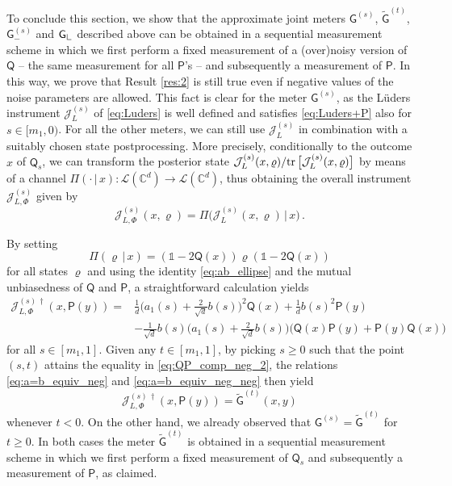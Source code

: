 \documentclass[12pt,reqno]{amsart}
\theoremstyle{definition}
\newcommand{\tr}[1]{{\rm tr}\left[#1\right]} %
\newcommand{\id}{\mathds{1}} %
\newcommand{\Qo}{\mathsf{Q}}%
\newcommand{\Po}{\mathsf{P}}%
\newcommand{\Go}{\mathsf{G}}%
\newcommand{\Lcorner}{{\mathchoice{\mathrel{\makebox[7pt][c]{\rule{.4pt}{7.5pt}\rule{5pt}{.4pt}}}}{\mathrel{\makebox[7pt][c]{\rule{.4pt}{7.5pt}\rule{5pt}{.4pt}}}}{\mathrel{\makebox[5.5pt][c]{\rule{.4pt}{5.25pt}\rule{3.5pt}{.4pt}}}}{\mathrel{\makebox[4pt][c]{\rule{.4pt}{3.75pt}\rule{2.5pt}{.4pt}}}}}}
\newcommand{\rhoo}{\varrho} %
\newcommand{\Cb}{\mathbb{C}} %
\newcommand{\lc}[1]{\mathcal{L}(\Cb^{#1})} %
\newcommand{\ii}{\mathcal{J}}
\begin{document}
To conclude this section, we show that the approximate joint meters $\Go^{(s)}$, $\tilde{\Go}^{(t)}$, $\Go^{(s)}_-$ and $\Go_\Lcorner$ described above can be obtained in a sequential measurement scheme in which we first perform a fixed measurement of a (over)noisy version of $\Qo$ -- the same measurement for all $\Po$'s --  and subsequently a measurement of $\Po$. In this way, we prove that Result \ref{res:2} is still true even if negative values of the noise parameters are allowed. This fact is clear for the meter $\Go^{(s)}$, as the L\"uders instrument $\ii_L^{(s)}$ of \eqref{eq:Luders} is well defined and satisfies \eqref{eq:Luders+P} also for $s\in [m_1,0)$. For all the other meters, we can still use $\ii_L^{(s)}$ in combination with a suitably chosen state postprocessing. More precisely, conditionally to the outcome $x$ of $\Qo_s$, we can transform the posterior state $\ii_L^{(s)}(x,\rhoo)/\tr{\vphantom{\big(}\smash{\ii_L^{(s)}(x,\rhoo)}}$ by means of a channel $\Pi(\cdot\,|\,x) :\lc{d}\to\lc{d}$, thus obtaining the overall instrument $\ii_{L,\Phi}^{(s)}$ given by
\begin{equation} %
\ii_{L,\Phi}^{(s)}(x,\rhoo) = \Pi\big(\ii_L^{(s)}(x,\rhoo)\,|\,x\big)\,.
\end{equation}

By setting
\begin{equation} %
\Pi(\rhoo\,|\,x) = (\id-2\Qo(x))\rhoo(\id-2\Qo(x))
\end{equation}
for all states $\rhoo$ and using the identity \eqref{eq:ab_ellipse} and the mutual unbiasedness of $\Qo$ and $\Po$, a straightforward calculation yields
\begin{align*}
\ii_{L,\Phi}^{(s)\,\dag}(x,\Po(y)) = {}& \frac{1}{d} \bigg( a_1(s) + \frac{2}{\sqrt{d}} b(s) \bigg)^2 \Qo(x) + \frac{1}{d} b(s)^2 \Po(y) \\
& - \frac{1}{\sqrt{d}} b(s)\bigg( a_1(s) + \frac{2}{\sqrt{d}} b(s) \bigg) \big(\Qo(x)\Po(y) + \Po(y)\Qo(x)\big)
\end{align*}
for all $s\in [m_1,1]$. Given any $t\in [m_1,1]$, by picking $s\geq 0$ such that the point $(s,t)$ attains the equality in \eqref{eq:QP_comp_neg_2}, the relations \eqref{eq:a=b_equiv_neg} and \eqref{eq:a=b_equiv_neg_neg} then yield
\begin{equation} %
\ii_{L,\Phi}^{(s)\,\dag}(x,\Po(y)) = \tilde{\Go}^{(t)}(x,y)
\end{equation}
whenever $t<0$. On the other hand, we already observed that $\Go^{(s)} = \tilde{\Go}^{(t)}$ for $t\geq 0$. In both cases the meter $\tilde{\Go}^{(t)}$ is obtained in a sequential measurement scheme in which we first perform a fixed measurement of $\Qo_s$ and subsequently a measurement of $\Po$, as claimed.
\end{document}
